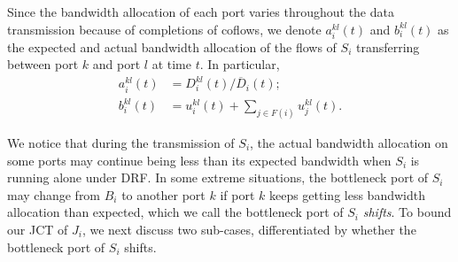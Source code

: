 \documentclass[10pt, conference, letterpaper]{IEEEtran}
\begin{document}
\begin{IEEEproof}
Since the bandwidth allocation of each port varies throughout the data transmission because of completions of coflows, we denote $a_i^{kl}(t)$ and $b_i^{kl}(t)$ as the expected and actual bandwidth allocation of the flows  of $S_i$ transferring between port $k$ and port $l$ at time $t$. In particular,
\begin{align}
	\label{actual} a_i^{kl}(t) &= D_i^{kl}(t)/\overline{D}_i(t);\\
	b_i^{kl}(t) &= u_i^{kl}(t) + \sum_{j\in F(i)}u_j^{kl}(t).
\end{align}

We notice that during the transmission of $S_i$, the actual bandwidth allocation on some ports may continue being less than its expected bandwidth when $S_i$  is running alone under DRF. In some extreme situations, the bottleneck port of $S_i$ may change from $B_i$ to another port $k$ if port $k$ keeps getting less bandwidth allocation than expected, which we call the bottleneck port of $S_i$ \emph{shifts}. To bound our JCT of $J_i$, we next discuss two sub-cases, differentiated by whether the bottleneck port of $S_i$ shifts.


\end{IEEEproof}
\end{document}
